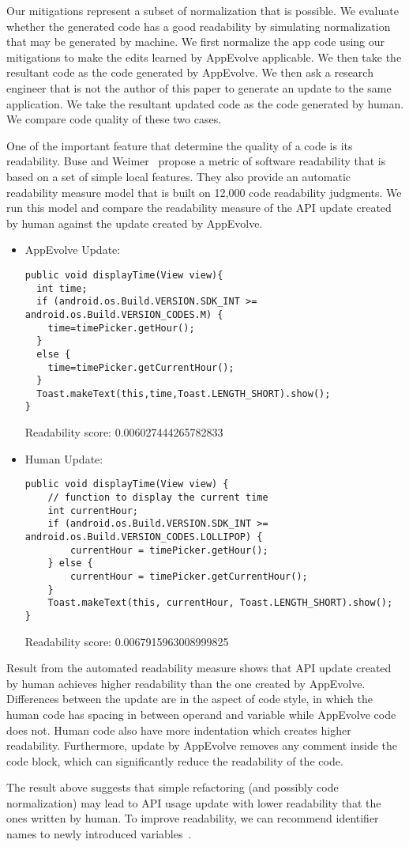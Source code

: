 Our mitigations represent a subset of normalization that is possible. We evaluate whether the generated code has a good readability by simulating normalization that may be generated by machine. We first normalize the app code using our mitigations to make the edits learned by AppEvolve applicable. We then take the resultant code as the code generated by AppEvolve. We then ask a research engineer that is not the author of this paper to generate an update to the same application. We take the resultant updated code as the code generated by human. We compare code quality of these two cases.


One of the important feature that determine the quality of a code is its readability. Buse and Weimer~\cite{Buse:2008:MSR:1390630.1390647} propose a metric of software readability that is based on a set of simple local features. They also provide an automatic readability measure model that is built on 12,000 code readability judgments. We run this model and compare the readability measure of the API update created by human against the update created by AppEvolve.
\begin{itemize}
\item AppEvolve Update:
\begin{lstlisting}[language=text,numbers=none]
public void displayTime(View view){
  int time;
  if (android.os.Build.VERSION.SDK_INT >= android.os.Build.VERSION_CODES.M) {
    time=timePicker.getHour();
  }
  else {
    time=timePicker.getCurrentHour();
  }
  Toast.makeText(this,time,Toast.LENGTH_SHORT).show();
}
\end{lstlisting}
Readability score: 0.006027444265782833


\item Human Update:
\begin{lstlisting}[language=text,numbers=none]
public void displayTime(View view) {
    // function to display the current time
    int currentHour;
    if (android.os.Build.VERSION.SDK_INT >= android.os.Build.VERSION_CODES.LOLLIPOP) {
        currentHour = timePicker.getHour();
    } else {
        currentHour = timePicker.getCurrentHour();
    }
    Toast.makeText(this, currentHour, Toast.LENGTH_SHORT).show();
}
\end{lstlisting}
Readability score: 0.0067915963008999825
\end{itemize}

Result from the automated readability measure shows that API update created by human achieves higher readability than the one created by AppEvolve. Differences between the update are in the aspect of code style, in which the human code has spacing in between operand and variable while AppEvolve code does not. Human code also have more indentation which creates higher readability. Furthermore, update by AppEvolve removes any comment inside the code block, which can significantly reduce the readability of the code.

The result above suggests that simple refactoring (and possibly code normalization) may lead to API usage update with lower readability that the ones written by human. To improve readability, we can recommend identifier names to newly introduced variables~\cite{...}.